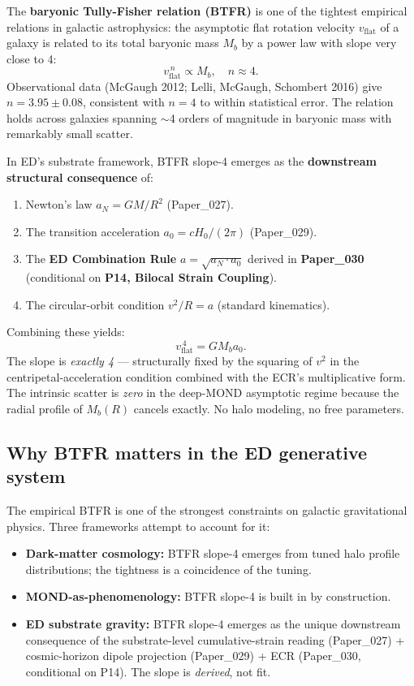 \documentclass[11pt,a4paper]{article}
\begin{document}
The \textbf{baryonic Tully-Fisher relation (BTFR)} is one of the tightest empirical relations in galactic astrophysics: the asymptotic flat rotation velocity $v_\mathrm{flat}$ of a galaxy is related to its total baryonic mass $M_b$ by a power law with slope very close to 4:
\[
v_\mathrm{flat}^{\,n} \propto M_b, \quad n \approx 4.
\]
Observational data (McGaugh 2012; Lelli, McGaugh, Schombert 2016) give $n = 3.95 \pm 0.08$, consistent with $n = 4$ to within statistical error. The relation holds across galaxies spanning $\sim$4 orders of magnitude in baryonic mass with remarkably small scatter.

In ED's substrate framework, BTFR slope-4 emerges as the \textbf{downstream structural consequence} of:

\begin{enumerate}[noitemsep]
\item Newton's law $a_N = GM/R^2$ (Paper\_027).
\item The transition acceleration $a_0 = cH_0/(2\pi)$ (Paper\_029).
\item The \textbf{ED Combination Rule} $a = \sqrt{a_N \cdot a_0}$ derived in \textbf{Paper\_030} (conditional on \textbf{P14, Bilocal Strain Coupling}).
\item The circular-orbit condition $v^2/R = a$ (standard kinematics).
\end{enumerate}

Combining these yields:
\[
v_\mathrm{flat}^{\,4} = G M_b a_0.
\]
The slope is \emph{exactly 4} --- structurally fixed by the squaring of $v^2$ in the centripetal-acceleration condition combined with the ECR's multiplicative form. The intrinsic scatter is \emph{zero} in the deep-MOND asymptotic regime because the radial profile of $M_b(R)$ cancels exactly. No halo modeling, no free parameters.

\subsection{Why BTFR matters in the ED generative system}

The empirical BTFR is one of the strongest constraints on galactic gravitational physics. Three frameworks attempt to account for it:

\begin{itemize}[noitemsep]
\item \textbf{Dark-matter cosmology:} BTFR slope-4 emerges from tuned halo profile distributions; the tightness is a coincidence of the tuning.
\item \textbf{MOND-as-phenomenology:} BTFR slope-4 is built in by construction.
\item \textbf{ED substrate gravity:} BTFR slope-4 emerges as the unique downstream consequence of the substrate-level cumulative-strain reading (Paper\_027) + cosmic-horizon dipole projection (Paper\_029) + ECR (Paper\_030, conditional on P14). The slope is \emph{derived}, not fit.
\end{itemize}
\end{document}

